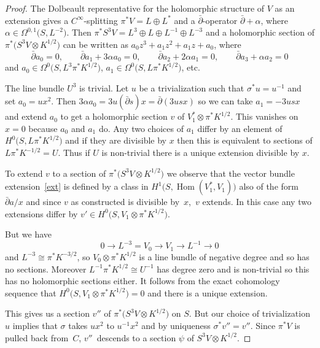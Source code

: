 \documentclass[pdftex]{sigma}
\def\Hom{\operatorname{Hom}}
\begin{document}
\begin{proof}
The Dolbeault representative for the holomorphic structure of $V$ as an extension gives a $C^{\infty}$-splitting $\pi^*V=L\oplus L^*$ and a $\bar\partial $-operator $\bar\partial +\alpha$, where $\alpha\in \Omega^{0,1}\big(S, L^{-2}\big)$. Then $\pi^*S^3V=L^{3}\oplus L\oplus L^{-1}\oplus L^{-3}$ and a holomorphic section of $\pi^*\big(S^3V\otimes K^{1/2}\big)$ can be written as $a_0z^3+a_1z^{2}+a_1z+a_0$, where
\begin{displaymath}\bar\partial a_0=0,\qquad \bar\partial a_1+3\alpha a_0=0,\qquad \bar\partial a_2+2\alpha a_1=0, \qquad \bar\partial a_3+\alpha a_2=0\end{displaymath}
and $a_0\in \Omega^0\big(S, L^3\pi^*K^{1/2}\big)$, $a_1\in \Omega^0\big(S, L\pi^*K^{1/2}\big)$, etc.

The line bundle $U^3$ is trivial. Let $u$ be a trivialization such that $\sigma^*u=u^{-1}$ and set $a_0=ux^2$. Then
$3\alpha a_0=3u(\bar\partial s) x=\bar\partial (3usx)$
so we can take $a_1=-3usx$ and extend $a_0$ to get a holomorphic section $v$ of $V_1^*\otimes \pi^*K^{1/2}$. This vanishes on $x=0$ because $a_0$ and $a_1$ do. Any two choices of $a_1$ differ by an element of $H^0\big(S, L\pi^*K^{1/2}\big)$ and if they are divisible by $x$ then this is equivalent to sections of $L\pi^*K^{-1/2}=U$. Thus if $U$ is non-trivial there is a unique extension divisible by $x$.

To extend $v$ to a section of $\pi^*\big(S^3V\otimes K^{1/2}\big)$ we observe that the vector bundle extension~\eqref{ext} is defined by a class in $H^1\big(S, \Hom(V_1^*,V_1)\big)$ also of the form $\bar\partial a/x$ and since $v$ as constructed is divisible by~$x$,~$v$ extends. In this case any two extensions differ by $v'\in H^0\big(S,V_1\otimes \pi^*K^{1/2}\big)$.

But we have
 \begin{displaymath}0\rightarrow L^{-3}=V_{0}\rightarrow V_{1}\rightarrow L^{-1}\rightarrow 0\end{displaymath}
and $L^{-3}\cong \pi^*K^{-3/2}$, so $V_0\otimes \pi^*K^{1/2}$ is a line bundle of negative degree and so has no sections. Moreover $L^{-1}\pi^*K^{1/2} \cong U^{-1}$ has degree zero and is non-trivial so this has no holomorphic sections either. It follows from the exact cohomology sequence that $H^0\big(S, V_1\otimes \pi^*K^{1/2}\big)=0$ and there is a unique extension.

 This gives us a section $v''$ of $\pi^*\big(S^3V\otimes K^{1/2}\big)$ on $S$. But our choice of trivialization $u$ implies that $\sigma$ takes $ux^2$ to $u^{-1}x^2$ and by uniqueness $\sigma^*v''=v''$. Since $\pi^*V$ is pulled back from~$C$, $v''$~descends to a section $\psi$ of $S^3V\otimes K^{1/2}$.
\end{proof}
\end{document}
